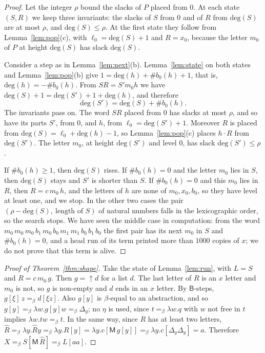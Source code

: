 \documentclass[a4paper,english]{lipics-v2021}
\newcommand{\B}{\mathsf{B}}
\newcommand{\M}{\mathsf{M}}
\newcommand{\eqb}{=_{\beta}}
\newcommand{\Del}[1]{\Delta_{#1}}
\newcommand{\hatw}[1]{\widehat{#1}}
\newcommand{\up}{{\uparrow}}
\newcommand{\dg}{\mathrm{deg}}
\newcommand{\nb}[1]{\#b_0(#1)}
\begin{document}
\begin{proof}
Let the integer $\rho$ bound the slacks of $P$ placed from $0$. At each state $(S,R)$ we keep three invariants: the slacks of $S$ from $0$ and of $R$ from $\dg(S)$ are at most $\rho$, and $\dg(S) \leq \rho$. At the first state they follow from Lemma~\ref{lem:pop}(c), with $\ell_0 = \dg(S)+1$ and $R = x_0$, because the letter $m_0$ of $P$ at height $\dg(S)$ has slack $\dg(S)$.

Consider a step as in Lemma~\ref{lem:next}(b). Lemma~\ref{lem:state} on both states and Lemma~\ref{lem:pop}(b) give $1 = \dg(h) + \nb{h} + 1$, that is, $\dg(h) = -\nb{h}$. From $SR = S'm_0h$ we have $\dg(S) + 1 = \dg(S') + 1 + \dg(h)$, and therefore
\[
\dg(S') = \dg(S) + \nb{h}.
\]
The invariants pass on. The word $SR$ placed from $0$ has slacks at most $\rho$, and so have its parts $S'$, from $0$, and $h$, from $\ell_0 = \dg(S')+1$. Moreover $R$ is placed from $\dg(S) = \ell_0 + \dg(h) - 1$, so Lemma~\ref{lem:pop}(c) places $h\cdot R$ from $\dg(S')$. The letter $m_0$, at height $\dg(S')$ and level $0$, has slack $\dg(S') \leq \rho$.

If $\nb{h} \geq 1$, then $\dg(S)$ rises. If $\nb{h} = 0$ and the letter $m_0$ lies in $S$, then $\dg(S)$ stays and $S'$ is shorter than $S$. If $\nb{h} = 0$ and this $m_0$ lies in $R$, then $R = c\,m_0\,h$, and the letters of $h$ are none of $m_0,x_0,b_0$, so they have level at least one, and we stop. In the other two cases the pair $(\rho - \dg(S),\ \text{length of } S)$ of natural numbers falls in the lexicographic order, so the search stops. We have seen the middle case in computation: from the word $m_0\,m_0\,m_0\,b_1\,m_0\,b_0\,m_1\,m_1\,b_0\,b_1\,b_0$ the first pair has its next $m_0$ in $S$ and $\nb{h} = 0$, and a head run of its term printed more than $1000$ copies of $x$; we do not prove that this term is alive.
\end{proof}

\begin{proof}[Proof of Theorem~\ref{thm:shape}]
Take the state of Lemma~\ref{lem:run}, with $L = S$ and $R = c\,m_0\,g$. Then $g = \up d$ for a list $d$. The last letter of $R$ is an $x$ letter and $m_0$ is not, so $g$ is non-empty and $d$ ends in an $x$ letter. By $\B$-steps, $g[\xi]\,z \eqb d[\xi z]$. Also $g[y]$ is $\beta$-equal to an abstraction, and so $g[y] \eqb \lambda w.g[y]w \eqb \Del{y}$; no $\eta$ is used, since $t \eqb \lambda w.q$ with $w$ not free in $t$ implies $\lambda w.tw \eqb t$. In the same way, since $R$ has at least two letters, $\hatw{R} \eqb \lambda y.\hatw{R}y \eqb \lambda y.R[y] = \lambda y.c[\M\,g[y]] \eqb \lambda y.c[\Del{y}\Del{y}] = a$. Therefore $X \eqb S[\M\,\hatw{R}] \eqb L[aa]$.
\end{proof}
\end{document}
